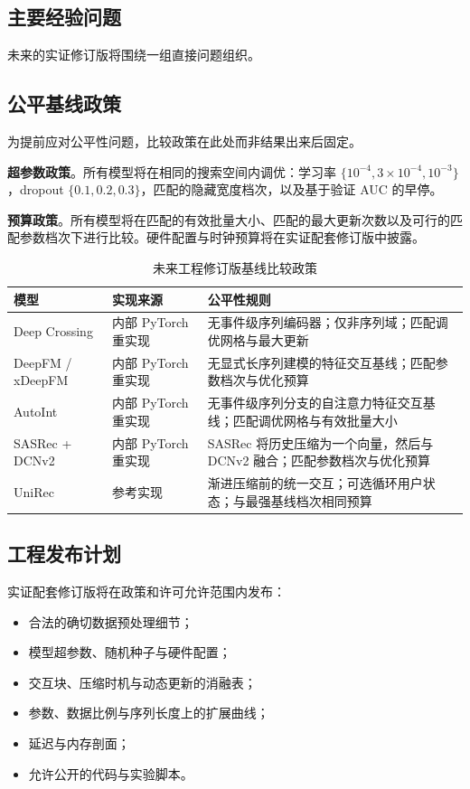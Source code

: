 \documentclass{article}
\begin{document}
\subsection{主要经验问题}

未来的实证修订版将围绕一组直接问题组织。

\subsection{公平基线政策}

为提前应对公平性问题，比较政策在此处而非结果出来后固定。

\textbf{超参数政策}。所有模型将在相同的搜索空间内调优：学习率 \(\{10^{-4}, 3\times10^{-4}, 10^{-3}\}\)，dropout \(\{0.1,0.2,0.3\}\)，匹配的隐藏宽度档次，以及基于验证 AUC 的早停。

\textbf{预算政策}。所有模型将在匹配的有效批量大小、匹配的最大更新次数以及可行的匹配参数档次下进行比较。硬件配置与时钟预算将在实证配套修订版中披露。

\begin{table}[htbp]
\centering
\caption{未来工程修订版基线比较政策}
\label{tab:baselines}
\begin{tabular}{l p{7cm} p{5cm}}
\toprule
\textbf{模型} & \textbf{实现来源} & \textbf{公平性规则} \\
\midrule
Deep Crossing & 内部 PyTorch 重实现 & 无事件级序列编码器；仅非序列域；匹配调优网格与最大更新 \\
DeepFM / xDeepFM & 内部 PyTorch 重实现 & 无显式长序列建模的特征交互基线；匹配参数档次与优化预算 \\
AutoInt & 内部 PyTorch 重实现 & 无事件级序列分支的自注意力特征交互基线；匹配调优网格与有效批量大小 \\
SASRec + DCNv2 & 内部 PyTorch 重实现 & SASRec 将历史压缩为一个向量，然后与 DCNv2 融合；匹配参数档次与优化预算 \\
UniRec & 参考实现 & 渐进压缩前的统一交互；可选循环用户状态；与最强基线档次相同预算 \\
\bottomrule
\end{tabular}
\end{table}

\subsection{工程发布计划}

实证配套修订版将在政策和许可允许范围内发布：
\begin{itemize}
\item 合法的确切数据预处理细节；
\item 模型超参数、随机种子与硬件配置；
\item 交互块、压缩时机与动态更新的消融表；
\item 参数、数据比例与序列长度上的扩展曲线；
\item 延迟与内存剖面；
\item 允许公开的代码与实验脚本。
\end{itemize}
\end{document}
